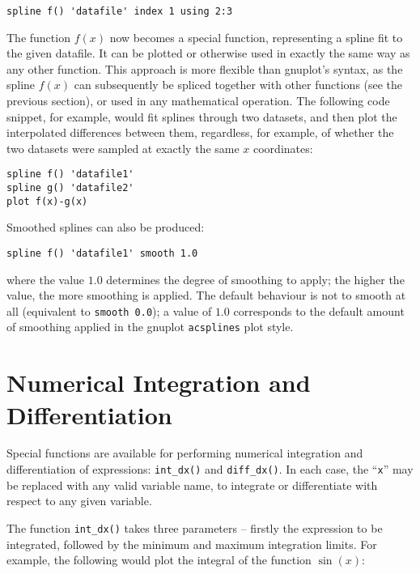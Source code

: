 \documentclass[a4paper,onecolumn,11pt]{book}
\begin{document}
\begin{verbatim}
spline f() 'datafile' index 1 using 2:3
\end{verbatim}

The function $f(x)$ now becomes a special function, representing a spline fit
to the given datafile. It can be plotted or otherwise used in exactly the same
way as any other function. This approach is more flexible than gnuplot's
syntax, as the spline $f(x)$ can subsequently be spliced together with other
functions (see the previous section), or used in any mathematical operation.
The following code snippet, for example, would fit splines through two
datasets, and then plot the interpolated differences between them, regardless,
for example, of whether the two datasets were sampled at exactly the same $x$
coordinates:

\begin{verbatim}
spline f() 'datafile1'
spline g() 'datafile2'
plot f(x)-g(x)
\end{verbatim}

Smoothed splines can also be produced:

\begin{verbatim}
spline f() 'datafile1' smooth 1.0
\end{verbatim}

\noindent where the value $1.0$ determines the degree of smoothing to apply;
the higher the value, the more smoothing is applied. The default behaviour is
not to smooth at all (equivalent to \texttt{smooth 0.0}); a value of $1.0$
corresponds to the default amount of smoothing applied in the
gnuplot \texttt{acsplines} plot style.

\section{Numerical Integration and Differentiation}

Special functions are available for performing numerical integration and
differentiation of expressions: \texttt{int\_dx()} and
\texttt{diff\_dx()}. In each case, the ``\texttt{x}'' may be
replaced with any valid variable name, to integrate or differentiate with
respect to any given variable.

The function \texttt{int\_dx()} takes three parameters -- firstly the
expression to be integrated, followed by the minimum and maximum integration
limits. For example, the following would plot the integral of the function
$\sin(x)$:
\end{document}
